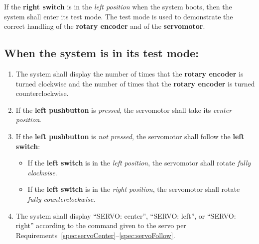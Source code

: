 If the \textbf{right switch} is in the \textit{left position} when the system boots, then the system shall enter its test mode.
The test mode is used to demonstrate the correct handling of the \textbf{rotary encoder} and of the \textbf{servomotor}.

\subsection*{When the system is in its test mode:}
\begin{enumerate}
    \item \label{spec:encoderCounts} The system shall display the number of times that the \textbf{rotary encoder} is turned clockwise and the number of times that the \textbf{rotary encoder} is turned counterclockwise.
    \item \label{spec:servoCenter} If the \textbf{left pushbutton} is \textit{pressed}, the servomotor shall take its \textit{center position}.
    \item \label{spec:servoFollow} If the \textbf{left pushbutton} is \textit{not pressed}, the servomotor shall follow the \textbf{left switch}:
        \begin{itemize}
            \item If the \textbf{left switch} is in the \textit{left position}, the servomotor shall rotate \textit{fully clockwise}.
            \item If the \textbf{left switch} is in the \textit{right position}, the servomotor shall rotate \textit{fully counterclockwise}.
        \end{itemize}
    \item \label{spec:servoString} The system shall display ``SERVO: center'', ``SERVO: left'', or ``SERVO: right'' according to the command given to the servo per Requirements~\ref{spec:servoCenter}--\ref{spec:servoFollow}.
\end{enumerate}
